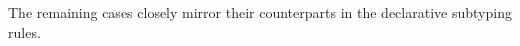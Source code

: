 \documentclass[acmsmall]{acmart}
\theoremstyle{definition}
\begin{document}
The remaining cases closely mirror their counterparts in the declarative subtyping rules.

\end{document}
